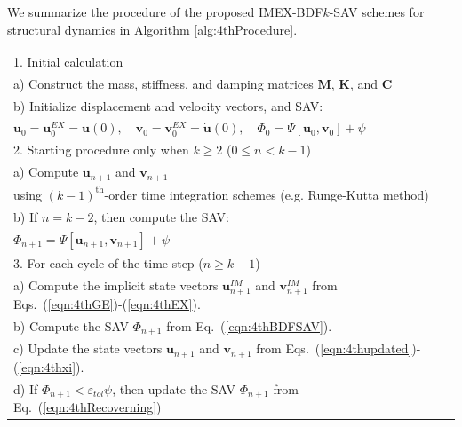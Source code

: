 \documentclass[review]{elsarticle}
\begin{document}
We summarize the procedure of the proposed IMEX-BDF$k$-SAV schemes for structural dynamics in Algorithm \ref{alg:4thProcedure}.

\begin{algorithm}[!htbp]
    \caption{\label{alg:4thProcedure} Time stepping for the IMEX-BDF$k$-SAV schemes.}
    \centering 
    \begin{tabular}{l}
        1. Initial calculation    \\
        \quad a) Construct the mass, stiffness, and damping matrices $\boldsymbol{M}$, $\boldsymbol{K}$, and $\boldsymbol{C}$  \\
        \quad b) Initialize displacement and velocity vectors, and SAV: \\
        \qquad $\boldsymbol{u}_0=\boldsymbol{u}^{EX}_0=\boldsymbol{u}(0), \quad \boldsymbol{v}_0=\boldsymbol{v}_0^{EX}=\dot{\boldsymbol{u}}(0), \quad \Phi_0 = \Psi[\boldsymbol{u}_0, \boldsymbol{v}_0] + \psi$ \\
        2. Starting procedure only when $k\ge2$ ($0 \le {n} < {k-1}$)  \\
        \quad a) Compute $\boldsymbol{u}_{n+1}$ and $\boldsymbol{v}_{n+1}$ \\
        \qquad using $(k-1)^\textrm{th}$-order time integration schemes (e.g. Runge-Kutta method) \\
        \quad b) If $n=k-2$, then compute the SAV: \\
        \qquad $\Phi_{n+1} = \Psi[\boldsymbol{u}_{n+1}, \boldsymbol{v}_{n+1}] + \psi$ \\
        3. For each cycle of the time-step (${n} \ge {k-1}$) \\
        \quad a) Compute the implicit state vectors $\boldsymbol{u}_{n+1}^{IM}$ and $\boldsymbol{v}_{n+1}^{IM}$ from Eqs.~(\ref{eqn:4thGE})-(\ref{eqn:4thEX}). \\
        \quad b) Compute the SAV $\Phi_{n+1}$ from Eq.~(\ref{eqn:4thBDFSAV}). \\
        \quad c) Update the state vectors $\boldsymbol{u}_{n+1}$ and $\boldsymbol{v}_{n+1}$ from Eqs.~(\ref{eqn:4thupdated})-(\ref{eqn:4thxi}). \\
        \quad d) If $\Phi_{n+1} <  \varepsilon_{tol} \psi$, then update the SAV $\Phi_{n+1}$ from Eq.~(\ref{eqn:4thRecoverning})
    \end{tabular}
\end{algorithm}
\end{document}
